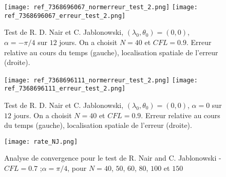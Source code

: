 \begin{figure}[ht]
\begin{center}
\texttt{[image: ref\_7368696067\_normerreur\_test\_2.png]}
\texttt{[image: ref\_7368696067\_erreur\_test\_2.png]}
\caption{Test de R. D. Nair et C. Jablonowski, $(\lambda_0, \theta_0) = (0,0)$, $\alpha= -\pi/4$ sur $12$ jours. On a choisit $N=40$ et $CFL=0.9$. Erreur relative au cours du temps (gauche), localisation spatiale de l'erreur (droite).}
\label{fig NJ2}
\end{center}
\end{figure}

\begin{figure}[ht]
\begin{center}
\texttt{[image: ref\_7368696111\_normerreur\_test\_2.png]}
\texttt{[image: ref\_7368696111\_erreur\_test\_2.png]}
\caption{Test de R. D. Nair et C. Jablonowski, $(\lambda_0, \theta_0) = (0,0)$, $\alpha= 0$ sur $12$ jours. On a choisit $N=40$ et $CFL=0.9$. Erreur relative au cours du temps (gauche), localisation spatiale de l'erreur (droite).}
\label{fig NJ3}
\end{center}
\end{figure}

\begin{figure}[ht]
\begin{center}
\texttt{[image: rate\_NJ.png]}
\caption{Analyse de convergence pour le test de R. Nair and C. Jablonowski -
$CFL = 0.7$ ;$ \alpha = \pi/4$, pour $N = 40$, $50$, $60$, $80$, $100$ et $150$}
\label{table NJ1}
\end{center}
\end{figure}
